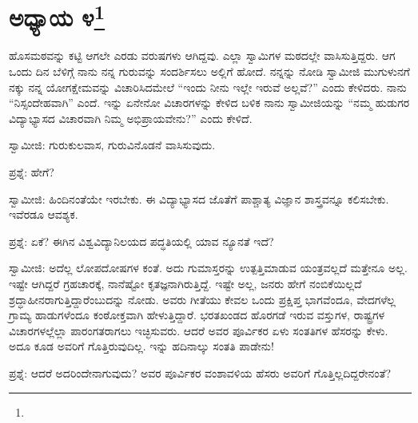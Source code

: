 \newpage

\chapter[ಅಧ್ಯಾಯ ೪]{ಅಧ್ಯಾಯ ೪\protect\footnote{}}

ಹೊಸಮಠವನ್ನು ಕಟ್ಟಿ ಆಗಲೇ ಎರಡು ವರುಷಗಳು ಆಗಿದ್ದವು. ಎಲ್ಲಾ ಸ್ವಾಮಿಗಳ ಮಠದಲ್ಲೇ ವಾಸಿಸುತ್ತಿದ್ದರು. ಆಗ ಒಂದು ದಿನ ಬೆಳಿಗ್ಗೆ ನಾನು ನನ್ನ ಗುರುವನ್ನು ಸಂದರ್ಶಿಸಲು ಅಲ್ಲಿಗೆ ಹೋದೆ. ನನ್ನನ್ನು ನೋಡಿ ಸ್ವಾಮೀಜಿ ಮುಗುಳುನಗೆ ನಕ್ಕು ನನ್ನ ಯೋಗಕ್ಷೇಮವನ್ನು ವಿಚಾರಿಸಿದಮೇಲೆ “ಇಂದು ನೀನು ಇಲ್ಲೇ ಇರುವೆ ಅಲ್ಲವೆ?” ಎಂದು ಕೇಳಿದರು. ನಾನು “ನಿಸ್ಸಂದೇಹವಾಗಿ” ಎಂದೆ. ಇನ್ನು ಏನೇನೋ ವಿಚಾರಗಳನ್ನು ಕೇಳಿದ ಬಳಿಕ ನಾನು ಸ್ವಾಮೀಜಿಯನ್ನು “ನಮ್ಮ ಹುಡುಗರ ವಿದ್ಯಾಭ್ಯಾಸದ ವಿಚಾರವಾಗಿ ನಿಮ್ಮ ಅಭಿಪ್ರಾಯವೇನು?” ಎಂದು ಕೇಳಿದೆ.

ಸ್ವಾಮೀಜಿ: ಗುರುಕುಲವಾಸ, ಗುರುವಿನೊಡನೆ ವಾಸಿಸುವುದು.

ಪ್ರಶ್ನೆ: ಹೇಗೆ?

ಸ್ವಾಮೀಜಿ: ಹಿಂದಿನಂತೆಯೇ ಇರಬೇಕು. ಈ ವಿದ್ಯಾಭ್ಯಾಸದ ಜೊತೆಗೆ ಪಾಶ್ಚಾತ್ಯ ವಿಜ್ಞಾನ ಶಾಸ್ತ್ರವನ್ನೂ ಕಲಿಸಬೇಕು. ಇವೆರಡೂ ಆವಶ್ಯಕ.

ಪ್ರಶ್ನೆ: ಏಕೆ? ಈಗಿನ ವಿಶ್ವವಿದ್ಯಾನಿಲಯದ ಪದ್ಧತಿಯಲ್ಲಿ ಯಾವ ನ್ಯೂನತೆ ಇದೆ?

ಸ್ವಾಮೀಜಿ: ಅದೆಲ್ಲ ಲೋಪದೋಷಗಳ ಕಂತೆ. ಅದು ಗುಮಾಸ್ತರನ್ನು ಉತ್ಪತ್ತಿಮಾಡುವ ಯಂತ್ರವಲ್ಲದೆ ಮತ್ತೇನೂ ಅಲ್ಲ. ಇಷ್ಟೇ ಆಗಿದ್ದರೆ ಗ್ರಹಚಾರಕ್ಕೆ, ನಾನೆಷ್ಟೋ ಕೃತಜ್ಞನಾಗಿರುತ್ತಿದ್ದೆ. ಇಷ್ಟೇ ಅಲ್ಲ, ಜನರು ಹೇಗೆ ನಂಬಿಕೆಯಿಲ್ಲದೆ ಶ್ರದ್ಧಾಹೀನರಾಗುತ್ತಿದ್ದಾರೆಂಬುದನ್ನು ನೋಡು. ಅವರು ಗೀತೆಯು ಕೇವಲ ಒಂದು ಪ್ರಕ್ಷಿಪ್ತ ಭಾಗವೆಂದೂ, ವೇದಗಳೆಲ್ಲ ಗ್ರಾಮ್ಯ ಹಾಡುಗಳೆಂದೂ ಕಂಠೋಕ್ತವಾಗಿ ಹೇಳುತ್ತಿದ್ದಾರೆ. ಭರತಖಂಡದ ಹೊರಗಡೆ ಇರುವ ವಸ್ತುಗಳ, ರಾಷ್ಟ್ರಗಳ ವಿಚಾರಗಳಲ್ಲೆಲ್ಲಾ ಪಾರಂಗತರಾಗಲು ಇಚ್ಛಿಸುವರು. ಆದರೆ ಅವರ ಪೂರ್ವಿಕರ ಏಳು ಸಂತತಿಗಳ ಹೆಸರನ್ನು ಕೇಳು. ಅದೂ ಕೂಡ ಅವರಿಗೆ ಗೊತ್ತಿರುವುದಿಲ್ಲ. ಇನ್ನು ಹದಿನಾಲ್ಕು ಸಂತತಿ ಪಾಡೇನು!

ಪ್ರಶ್ನೆ: ಆದರೆ ಅದರಿಂದೇನಾಗುವುದು? ಅವರ ಪೂರ್ವಿಕರ ವಂಶಾವಳಿಯ ಹೆಸರು ಅವರಿಗೆ ಗೊತ್ತಿಲ್ಲದಿದ್ದರೇನಂತೆ?


